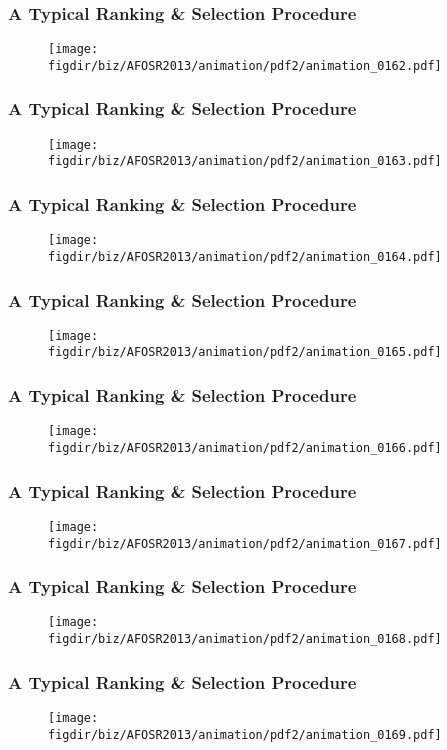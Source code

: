 \documentclass[13pt]{beamer}
\newcommand{\figdir}{../../fig}
\begin{document}
{\begin{frame}\frametitle{A Typical Ranking \& Selection Procedure}\begin{figure}\texttt{[image: \\figdir/biz/AFOSR2013/animation/pdf2/animation\_0162.pdf]}\end{figure}\end{frame}
\begin{frame}\frametitle{A Typical Ranking \& Selection Procedure}\begin{figure}\texttt{[image: \\figdir/biz/AFOSR2013/animation/pdf2/animation\_0163.pdf]}\end{figure}\end{frame}
\begin{frame}\frametitle{A Typical Ranking \& Selection Procedure}\begin{figure}\texttt{[image: \\figdir/biz/AFOSR2013/animation/pdf2/animation\_0164.pdf]}\end{figure}\end{frame}
\begin{frame}\frametitle{A Typical Ranking \& Selection Procedure}\begin{figure}\texttt{[image: \\figdir/biz/AFOSR2013/animation/pdf2/animation\_0165.pdf]}\end{figure}\end{frame}
\begin{frame}\frametitle{A Typical Ranking \& Selection Procedure}\begin{figure}\texttt{[image: \\figdir/biz/AFOSR2013/animation/pdf2/animation\_0166.pdf]}\end{figure}\end{frame}
\begin{frame}\frametitle{A Typical Ranking \& Selection Procedure}\begin{figure}\texttt{[image: \\figdir/biz/AFOSR2013/animation/pdf2/animation\_0167.pdf]}\end{figure}\end{frame}
\begin{frame}\frametitle{A Typical Ranking \& Selection Procedure}\begin{figure}\texttt{[image: \\figdir/biz/AFOSR2013/animation/pdf2/animation\_0168.pdf]}\end{figure}\end{frame}
\begin{frame}\frametitle{A Typical Ranking \& Selection Procedure}\begin{figure}\texttt{[image: \\figdir/biz/AFOSR2013/animation/pdf2/animation\_0169.pdf]}\end{figure}\end{frame}
}
\end{document}
